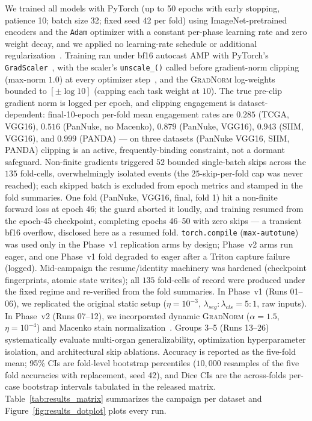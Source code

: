 \documentclass[preprint,12pt]{elsarticle}
\begin{document}
We trained all models with PyTorch (up to 50 epochs with early stopping, patience 10; batch size 32; fixed seed 42 per fold) using ImageNet-pretrained encoders and the \texttt{Adam} optimizer with a constant per-phase learning rate and zero weight decay, and we applied no learning-rate schedule or additional regularization~\cite{davila2024finetuning}. Training ran under bf16 autocast AMP with PyTorch's \texttt{GradScaler}~\cite{pytorchamp}, with the scaler's \texttt{unscale\_()} called before gradient-norm clipping (max-norm $1.0$) at every optimizer step~\cite{moassefi2024checklist,maleki2024ridge}, and the \textsc{GradNorm} log-weights bounded to $[\pm\log 10]$ (capping each task weight at $10$). The true pre-clip gradient norm is logged per epoch, and clipping engagement is dataset-dependent: final-10-epoch per-fold mean engagement rates are $0.285$ (TCGA, VGG16), $0.516$ (PanNuke, no Macenko), $0.879$ (PanNuke, VGG16), $0.943$ (SIIM, VGG16), and $0.999$ (PANDA) --- on three datasets (PanNuke VGG16, SIIM, PANDA) clipping is an active, frequently-binding constraint, not a dormant safeguard. Non-finite gradients triggered $52$ bounded single-batch skips across the $135$ fold-cells, overwhelmingly isolated events (the $25$-skip-per-fold cap was never reached); each skipped batch is excluded from epoch metrics and stamped in the fold summaries. One fold (PanNuke, VGG16, final, fold 1) hit a non-finite forward loss at epoch 46; the guard aborted it loudly, and training resumed from the epoch-45 checkpoint, completing epochs 46--50 with zero skips --- a transient bf16 overflow, disclosed here as a resumed fold. \texttt{torch.compile} (\texttt{max-autotune}) was used only in the Phase~v1 replication arms by design; Phase~v2 arms run eager, and one Phase~v1 fold degraded to eager after a Triton capture failure (logged). Mid-campaign the resume/identity machinery was hardened (checkpoint fingerprints, atomic state writes); all $135$ fold-cells of record were produced under the fixed regime and re-verified from the fold summaries. In Phase~v1 (Runs 01--06), we replicated the original static setup ($\eta=10^{-3}$, $\lambda_{seg}:\lambda_{cls}=5:1$, raw inputs). In Phase~v2 (Runs 07--12), we incorporated dynamic \textsc{GradNorm} ($\alpha=1.5$, $\eta=10^{-4}$) and Macenko stain normalization~\cite{macenko2009method}. Groups 3--5 (Runs 13--26) systematically evaluate multi-organ generalizability, optimization hyperparameter isolation, and architectural skip ablations. Accuracy is reported as the five-fold mean; 95\% CIs are fold-level bootstrap percentiles ($10{,}000$ resamples of the five fold accuracies with replacement, seed 42), and Dice CIs are the across-folds per-case bootstrap intervals tabulated in the released matrix. Table~\ref{tab:results_matrix} summarizes the campaign per dataset and Figure~\ref{fig:results_dotplot} plots every run.
\end{document}
